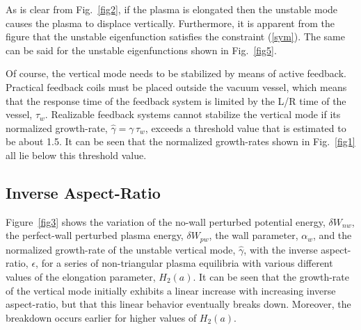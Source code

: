 \documentclass[12pt,prb,aps]{revtex4-1}
\begin{document}
 As is clear from Fig.~\ref{fig2}, if the plasma is  elongated then the unstable mode causes the
plasma to displace vertically. Furthermore, it is apparent  from the figure that the unstable eigenfunction satisfies the constraint (\ref{sym}).  The same can be
said for the unstable eigenfunctions shown in Fig.~\ref{fig5}.

Of course, the vertical mode needs to be stabilized by means of active feedback. Practical feedback coils must be
placed outside the vacuum vessel, which means that the response time of the feedback system is limited by the L/R time of the vessel, $\tau_w$.  Realizable feedback
systems cannot stabilize the vertical mode if its normalized growth-rate, $\hat{\gamma}=\gamma\,\tau_w$, exceeds a threshold value that is estimated to be about
1.5.\cite{f2} It can be seen that the normalized growth-rates shown in Fig.~\ref{fig1} all lie below this threshold value. 

\subsection{Inverse Aspect-Ratio}
Figure~\ref{fig3} shows the variation of the no-wall perturbed potential energy, $\delta W_{nw}$, the perfect-wall perturbed plasma energy, $\delta W_{pw}$, the wall 
parameter, $\alpha_w$, and the normalized growth-rate of the unstable vertical mode, $\hat{\gamma}$, with the inverse
aspect-ratio, $\epsilon$, for a series of
non-triangular plasma equilibria with various different values of the elongation parameter, $H_2(a)$. It can be seen that the growth-rate of the vertical 
mode initially exhibits a linear increase with increasing inverse aspect-ratio, but that this linear behavior eventually breaks down. Moreover, the breakdown occurs
earlier for higher values of $H_2(a)$. 
\end{document}
